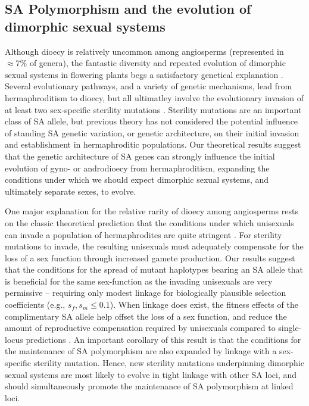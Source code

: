 \documentclass[9pt,twocolumn,twoside,lineno]{gsajnl}
\begin{document}
\subsection{SA Polymorphism and the evolution of dimorphic sexual systems}

Although dioecy is relatively uncommon among angiosperms (represented in $\approx 7\%$ of genera), the fantastic diversity and repeated evolution of dimorphic sexual systems in flowering plants begs a satisfactory genetical explanation \citep{Renner2014,KaferPannell2017}. Several evolutionary pathways, and a variety of genetic mechanisms, lead from hermaphroditism to dioecy, but all ultimatley involve the evolutionary invasion of at least two sex-specific sterility mutations \citep{Charlesworth1978a,Charlesworth1978b,Renner2014,Ashman2015}. Sterility mutations are an important class of SA allele, but previous theory has not considered the potential influence of standing SA genetic variation, or genetic architecture, on their initial invasion and establishment in hermaphroditic populations. Our theoretical results suggest that the genetic architecture of SA genes can strongly influence the initial evolution of gyno- or androdioecy from hermaphroditism, expanding the conditions under which we should expect dimorphic sexual systems, and ultimately separate sexes, to evolve. 

One major explanation for the relative rarity of dioecy among angiosperms rests on the classic theoretical prediction that the conditions under which unisexuals can invade a population of hermaphrodites are quite stringent \citep{Lloyd1975,Lloyd1976,Charlesworth1978a,KaferPannell2017}. For sterility mutations to invade, the resulting unisexuals must adequately compensate for the loss of a sex function through increased gamete production. Our results suggest that the conditions for the spread of mutant haplotypes bearing an SA allele that is beneficial for the same sex-function as the invading unisexuals are very permissive -- requiring only modest linkage for biologically plausible selection coefficients (e.g., $s_f,s_m \leq 0.1$). When linkage does exist, the fitness effects of the complimentary SA allele help offset the loss of a sex function, and reduce the amount of reproductive compensation required by unisexuals compared to single-locus predictions \citep{Charlesworth1978a}. An important corollary of this result is that the conditions for the maintenance of SA polymorphism are also expanded by linkage with a sex-specific sterility mutation. Hence, new sterility mutations underpinning dimorphic sexual systems are most likely to evolve in tight linkage with other SA loci, and should simultaneously promote the maintenance of SA polymorphism at linked loci. 
\end{document}
